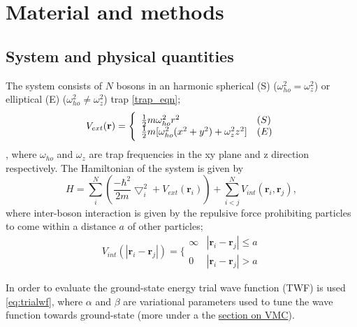 \documentclass[%
oneside,                 %
final,                   %
10pt]{article}
\begin{document}
\section{Material and methods} \label{theory}
\subsection{System and physical quantities}
The system consists of $N$ bosons in an harmonic spherical (S) ($\omega_{ho}^2=\omega_z^2$) or elliptical (E) ($\omega_{ho}^2 \neq \omega_z^2$) trap \eqref{trap_eqn};
\begin{equation}
 V_{ext}(\mathbf{r}) = 
 \Bigg\{
 \begin{array}{ll}
	 \frac{1}{2}m\omega_{ho}^2r^2 & (S)\\
 \strut
	 \frac{1}{2}m[\omega_{ho}^2(x^2+y^2) + \omega_z^2z^2] & (E)
 \label{trap_eqn}
 \end{array}
 \end{equation}
, where $\omega_{ho}$ and  $\omega_z$ are trap frequencies in the xy plane and z direction respectively. The Hamiltonian of the system is given by
\begin{equation}
     H = \sum_i^N \left(\frac{-\hbar^2}{2m}{\bigtriangledown }_{i}^2 +V_{ext}({\mathbf{r}}_i)\right)  +
	 \sum_{i<j}^{N} V_{int}({\mathbf{r}}_i,{\mathbf{r}}_j),
	 \label{eq:hamiltonian}
 \end{equation}
where inter-boson interaction is given by the repulsive force prohibiting particles to come within a distance $a$ of other particles;
\begin{equation}
 V_{int}(|\mathbf{r}_i-\mathbf{r}_j|) =  \Bigg\{
 \begin{array}{ll}
	 \infty & {|\mathbf{r}_i-\mathbf{r}_j|} \leq {a}\\
	 0 & {|\mathbf{r}_i-\mathbf{r}_j|} > {a}
 \end{array}
 \end{equation}

In order to evaluate the ground-state energy trial wave function (TWF) is used \eqref{eq:trialwf}, where $\alpha$ and $\beta$ are variational parameters used to tune the wave function towards ground-state (more under a the \hyperref[S:VMC]{section on VMC}).
\end{document}
